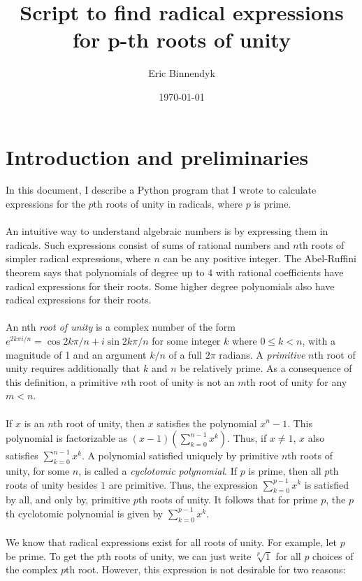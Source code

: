 \documentclass{article}
\title{Script to find radical expressions for p-th roots of unity}
\author{Eric Binnendyk}
\date{\today}
\begin{document}
\maketitle

\section{Introduction and preliminaries}
    In this document, I describe a Python program that I wrote to calculate expressions for the $ p $th roots of unity in radicals, where $ p $ is prime.\\
    \\
    An intuitive way to understand algebraic numbers is by expressing them in radicals. Such expressions consist of sums of rational numbers and $ n $th roots of simpler radical expressions, where $ n $ can be any positive integer. The Abel-Ruffini theorem says that polynomials of degree up to $ 4 $ with rational coefficients have radical expressions for their roots. Some higher degree polynomials also have radical expressions for their roots.\\
    \\
    An nth \textit{root of unity} is a complex number of the form $ e^{2k \pi i/n} = \cos{2k \pi/n} + i \sin{2k \pi/n} $ for some integer $ k $ where $ 0 \le k < n $, with a magnitude of 1 and an argument $ k/n $ of a full $ 2 \pi $ radians. A \textit{primitive} $ n $th root of unity requires additionally that $ k $ and $ n $ be relatively prime. As a consequence of this definition, a primitive $ n $th root of unity is not an $ m $th root of unity for any $ m < n $.\\
    \\
    If $ x $ is an $ n $th root of unity, then $ x $ satisfies the polynomial $ x^n - 1 $. This polynomial is factorizable as $ (x - 1)(\sum_{k = 0}^{n - 1} x^k) $. Thus, if $ x \ne 1 $, $ x $ also satisfies $ \sum_{k = 0}^{n - 1} x^k $. A polynomial satisfied uniquely by primitive $ n $th roots of unity, for some $ n $, is called a \textit{cyclotomic polynomial}. If $ p $ is prime, then all $ p $th roots of unity besides $ 1 $ are primitive. Thus, the expression $ \sum_{k = 0}^{p - 1} x^k $ is satisfied by all, and only by, primitive $ p $th roots of unity. It follows that for prime $ p $, the $ p $th cyclotomic polynomial is given by $ \sum_{k = 0}^{p - 1} x^k $.\\
    \\
    We know that radical expressions exist for all roots of unity. For example, let $ p $ be prime. To get the $ p $th roots of unity, we can just write $ \sqrt[p]{1} $ for all $ p $ choices of the complex $ p $th root. However, this expression is not desirable for two reasons:
\end{document}
